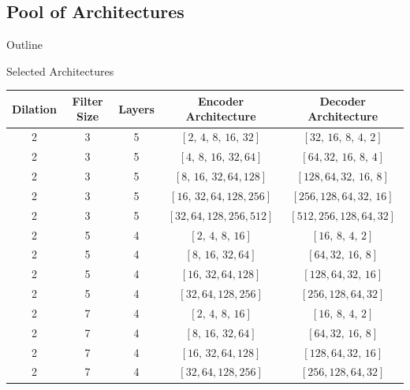 \documentclass[8pt,xcolor=dvipsnames,compress]{beamer}
\begin{document}
\subsection{Pool of Architectures}
\begin{frame}{Outline}
\end{frame}

\begin{frame}{Selected Architectures}
\footnotesize
\begin{table}[h!]
    \centering
    \renewcommand{\arraystretch}{1.4}
    \begin{tabular}{|c|c|c|c|c|}
        \hline
        \textbf{Dilation} & \textbf{Filter Size} & \textbf{Layers} & \textbf{Encoder Architecture} & \textbf{Decoder Architecture} \\
        \hline
        2 & 3 & 5 & $[2,\,4,\,8,\,16,\,32]$ & $[32,\,16,\,8,\,4,\,2]$ \\
        2 & 3 & 5 & $[4,\,8,\,16,\,32,64]$ & $[64,32,\,16,\,8,\,4]$ \\
        2 & 3 & 5 & $[8,\,16,\,32,64,128]$ & $[128,64,32,\,16,\,8]$ \\
        2 & 3 & 5 & $[16,\,32,64,128,256]$ & $[256,128,64,32,\,16]$ \\
        2 & 3 & 5 & $[32,64,128,256,512]$ & $[512,256,128,64,32]$ \\
        \hline
        2 & 5 & 4 & $[2,\,4,\,8,\,16]$ & $[16,\,8,\,4,\,2]$ \\
        2 & 5 & 4 & $[8,\,16,\,32,64]$ & $[64,32,\,16,\,8]$ \\
        2 & 5 & 4 & $[16,\,32,64,128]$ & $[128,64,32,\,16]$ \\
        2 & 5 & 4 & $[32,64,128,256]$ & $[256,128,64,32]$ \\
        \hline
        2 & 7 & 4 & $[2,\,4,\,8,\,16]$ & $[16,\,8,\,4,\,2]$ \\
        2 & 7 & 4 & $[8,\,16,\,32,64]$ & $[64,32,\,16,\,8]$ \\
        2 & 7 & 4 & $[16,\,32,64,128]$ & $[128,64,32,\,16]$ \\
        2 & 7 & 4 & $[32,64,128,256]$ & $[256,128,64,32]$ \\
        \hline
    \end{tabular}
    \label{tab:tcn_architectures}
\end{table}

\end{frame}
\end{document}
